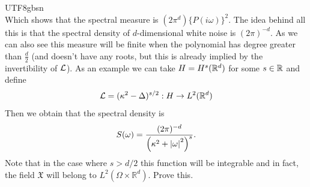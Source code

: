 \documentclass[12pt]{article}
\newcommand{\red}[1]{{\color{red}#1}}
\begin{document}
\begin{CJK*}{UTF8}{gbsn}
\begin{equation*}
	\end{equation*}
	Which shows that the spectral measure is $(2\pi^d)\{P(i\omega)\}^2$. The idea behind all this is that the spectral density of $d$-dimensional white noise is $(2\pi)^{-d}$. As we can also see this measure will be finite when the polynomial has degree greater than $\frac{d}{2}$
	(and doesn't have any roots, but this is already implied by the invertibility of $\mathcal{L}$). As an example we can take $H=H^s({\mathbb R}^d)$  for some $s\in {\mathbb R}$ and define
	\begin{equation*}
		\mathcal{L}=(\kappa^2-\Delta)^{s/2}: H\to L^2({\mathbb R}^d)
	\end{equation*}
	Then we obtain that the spectral density is
	\begin{equation*}
		S(\omega)=\frac{(2\pi)^{-d}}{\left(\kappa^2+\abs{\omega}^2\right)^s}.
	\end{equation*}
	Note that in the case where $s>d/2$ this function will be integrable and in fact, the field $\mathfrak{X}$ will  belong to $L^2(\Omega\times\mathbb{R}^d)$. \red{Prove this}.
\end{CJK*}




\end{document}
